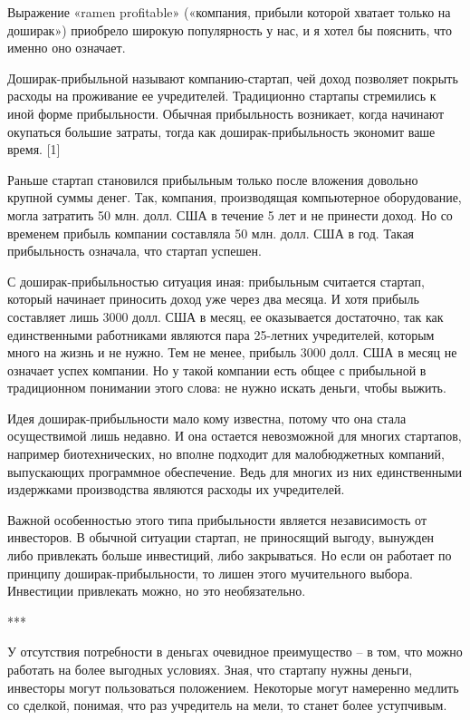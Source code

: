 \documentclass[ebook,12pt,oneside,openany]{memoir}
\begin{document}
\maketitle

Выражение «ramen profitable» («компания, прибыли которой хватает
только на доширак») приобрело широкую популярность у нас, и я хотел бы
пояснить, что именно оно означает.

Доширак-прибыльной называют компанию-стартап, чей доход позволяет
покрыть расходы на проживание ее учредителей. Традиционно стартапы
стремились к иной форме прибыльности. Обычная прибыльность возникает,
когда начинают окупаться большие затраты, тогда как
доширак-прибыльность экономит ваше время. [1]

Раньше стартап становился прибыльным только после вложения довольно
крупной суммы денег. Так, компания, производящая компьютерное
оборудование, могла затратить 50 млн. долл. США в течение 5 лет и не
принести доход. Но со временем прибыль компании составляла 50 млн.
долл. США в год. Такая прибыльность означала, что стартап успешен.

С доширак-прибыльностью ситуация иная: прибыльным считается стартап,
который начинает приносить доход уже через два месяца. И хотя прибыль
составляет лишь 3000 долл. США в месяц, ее оказывается достаточно, так
как единственными работниками являются пара 25-летних учредителей,
которым много на жизнь и не нужно. Тем не менее, прибыль 3000 долл.
США в месяц не означает успех компании. Но у такой компании есть общее
с прибыльной в традиционном понимании этого слова: не нужно искать
деньги, чтобы выжить.

Идея доширак-прибыльности мало кому известна, потому что она стала
осуществимой лишь недавно. И она остается невозможной для многих
стартапов, например биотехнических, но вполне подходит для
малобюджетных компаний, выпускающих программное обеспечение. Ведь для
многих из них единственными издержками производства являются расходы
их учредителей.

Важной особенностью этого типа прибыльности является независимость от
инвесторов. В обычной ситуации стартап, не приносящий выгоду, вынужден
либо привлекать больше инвестиций, либо закрываться. Но если он
работает по принципу доширак-прибыльности, то лишен этого мучительного
выбора. Инвестиции привлекать можно, но это необязательно.

***

У отсутствия потребности в деньгах очевидное преимущество – в том, что
можно работать на более выгодных условиях. Зная, что стартапу нужны
деньги, инвесторы могут пользоваться положением. Некоторые могут
намеренно медлить со сделкой, понимая, что раз учредитель на мели, то
станет более уступчивым.
\end{document}
